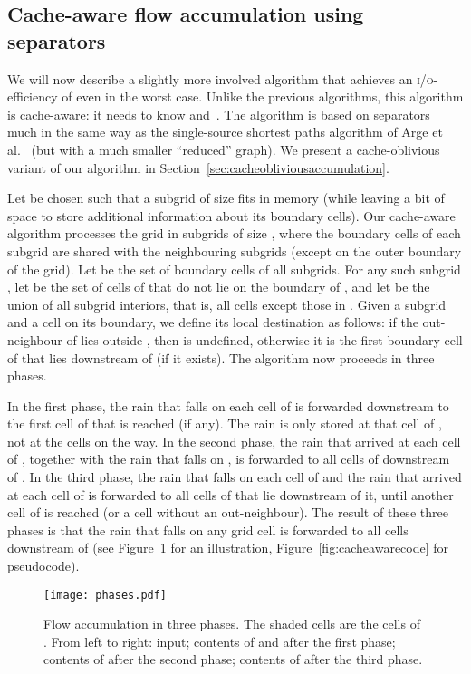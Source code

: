 \documentclass[10pt,a4paper]{article}
\def\io{\textsc{i/o}\xspace}
\begin{document}
\subsection{Cache-aware flow accumulation using separators}\label{sec:cacheawareaccumulation}

We will now describe a slightly more involved algorithm that achieves an \io-efficiency of  even in the worst case. Unlike the previous algorithms, this algorithm is cache-aware: it needs to know  and~. The algorithm is based on separators much in the same way as the single-source shortest paths algorithm of Arge et al.~\cite{gridproblems} (but with a much smaller ``reduced'' graph). We present a cache-oblivious variant of our algorithm in Section~\ref{sec:cacheobliviousaccumulation}.

Let  be chosen such that a subgrid of size  fits in memory (while leaving a bit of space to store additional information about its boundary cells). Our cache-aware algorithm processes the grid in subgrids of size , where the boundary cells of each subgrid are shared with the neighbouring subgrids (except on the outer boundary of the grid). Let  be the set of boundary cells of all subgrids. For any such subgrid , let  be the set of cells of  that do not lie on the boundary of , and let  be the union of all subgrid interiors, that is, all cells except those in . Given a subgrid  and a cell  on its boundary, we define its local destination  as follows: if the out-neighbour of  lies outside , then  is undefined, otherwise it is the first boundary cell of  that lies downstream of  (if it exists). The algorithm now proceeds in three phases.

In the first phase, the rain that falls on each cell of  is forwarded downstream to the first cell of  that is reached (if any). The rain is only stored at that cell of , not at the cells on the way. In the second phase, the rain that arrived at each cell  of , together with the rain that falls on , is forwarded to all cells of  downstream of . In the third phase, the rain that falls on each cell of  and the rain that arrived at each cell of  is forwarded to all cells of  that lie downstream of it, until another cell of  is reached (or a cell without an out-neighbour). The result of these three phases is that the rain that falls on any grid cell  is forwarded to all cells downstream of  (see Figure~\ref{fig:cacheawarephases} for an illustration, Figure~\ref{fig:cacheawarecode} for pseudocode).

\begin{figure}
\centering
\texttt{[image: phases.pdf]}
\caption{Flow accumulation in three phases. The shaded cells are the cells of . From left to right: input; contents of  and  after the first phase; contents of  after the second phase; contents of  after the third phase.}
\label{fig:cacheawarephases}
\end{figure}
\end{document}
